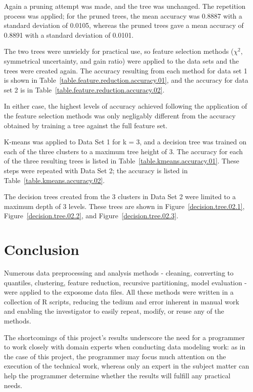\documentclass[conference,compsoc]{IEEEtran}
\begin{document}
Again a pruning attempt was made, and the tree was unchanged. The repetition process was applied; for the pruned trees, the mean accuracy was 0.8887 
with a standard deviation of 0.0105,
whereas the pruned trees gave a mean accuracy of 0.8891 with a standard deviation of 0.0101.

The two trees were unwieldy for practical use, so feature selection methods (${\chi}^2$, symmetrical uncertainty, and gain ratio) were applied to the data sets
and the trees were created again. The accuracy resulting from each method for data set 1 is shown in Table~\ref{table.feature.reduction.accuracy.01},
and the accuracy for data set 2 is in Table~\ref{table.feature.reduction.accuracy.02}.

In either case, the highest levels of accuracy achieved following the application of the feature selection methods was only negligably different
from the accuracy obtained by training a tree against the full feature set.

K-means was applied to Data Set 1 for k = 3, and a decision tree was trained on each of the three clusters to a maximum tree height of 3. 
The accuracy for each of the three resulting trees is listed in Table~\ref{table.kmeans.accuracy.01}.
These steps were repeated with Data Set 2; the accuracy is listed in Table~\ref{table.kmeans.accuracy.02}.

The decision trees created from the 3 clusters in Data Set 2 were limited to a maximum depth of 3 levels. These trees are shown in 
Figure~\ref{decision.tree.02.1}, Figure~\ref{decision.tree.02.2}, and Figure~\ref{decision.tree.02.3}.

\section{Conclusion}

Numerous data preprocessing and analysis methods - cleaning, converting to quantiles, clustering, feature reduction,
recursive partitioning, model evaluation - were applied to the exposome data files. All these methods were written in a collection of R
scripts, reducing the tedium and error inherent in manual work and enabling the investigator to easily repeat,
modify, or reuse any of the methods.

The shortcomings of this project's results underscore the need for a programmer to work closely with domain experts when conducting data modeling work:
as in the case of this project, the programmer may focus much attention on the execution of the technical work, whereas only an expert in the
subject matter can help the programmer determine whether the results will fulfill any practical needs.
\end{document}
